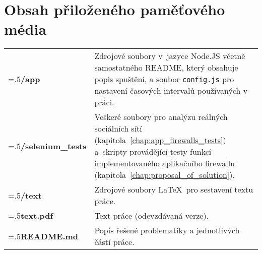 \chapter{Obsah přiloženého paměťového média}

\setlength{\extrarowheight}{15pt}

\begin{table}[H]
\begin{tabularx}{\linewidth}{
  >{\raggedright\arraybackslash\hsize=.5\hsize}X >{\hsize=1.5\hsize}X
  }

\textbf{/app} & Zdrojové soubory v~jazyce Node.JS včetně samostatného README, který obsahuje popis spuštění, a soubor \texttt{config.js} pro nastavení časových intervalů používaných v práci.\\

\textbf{/selenium\_tests} & Veškeré soubory pro analýzu reálných sociálních sítí (kapitola~\ref{chap:app_firewalls_tests}) a~skripty provádějící testy funkcí implementovaného aplikačního firewallu (kapitola~\ref{chap:proposal_of_solution}). \\

\textbf{/text} & Zdrojové soubory \LaTeX~pro sestavení textu práce. \\

\textbf{text.pdf} & Text práce (odevzdávaná verze). \\

\textbf{README.md} & Popis řešené problematiky a jednotlivých částí práce. \\

\end{tabularx}
\end{table}